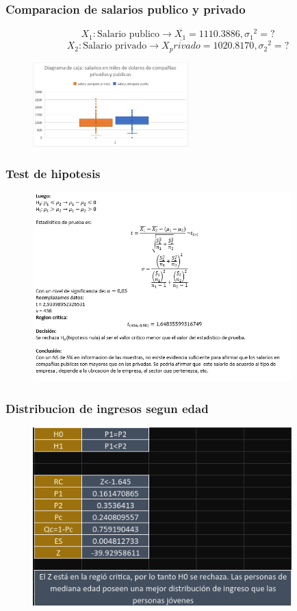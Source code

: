 \documentclass{beamer}
\begin{document}
\begin{frame}
  \frametitle{Comparacion de salarios publico y privado}
  \[{X_1}: \textrm{Salario publico} \rightarrow \overline{X_1} = 1110.3886, {\sigma_1}^2 = ?\]
  \[{X_2}: \textrm{Salario privado} \rightarrow \overline{X_privado} = 1020.8170, {\sigma_2}^2 = ?\]
\begin{figure}[t]
  \includegraphics[width=6cm]{cajas2.jpeg}
\end{figure}
\end{frame}

\begin{frame}
  \frametitle{Test de hipotesis}
\begin{figure}[t]
    \includegraphics[width=10cm]{Screenshot_20221028_235052.png}
\end{figure}
\end{frame}

\begin{frame}
  \frametitle{Distribucion de ingresos segun edad}
\begin{figure}[t]
    \includegraphics[width=10cm]{cuyate1.png}
\end{figure}
\end{frame}
\end{document}
